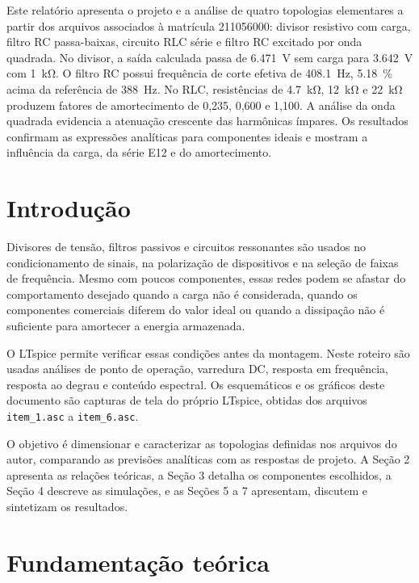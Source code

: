 \documentclass[11pt,a4paper]{article}
\begin{document}
\capa

\begin{resumo}
Este relatório apresenta o projeto e a análise de quatro topologias elementares a partir dos
arquivos associados à matrícula 211056000: divisor resistivo com carga, filtro RC passa-baixas,
circuito RLC série e filtro RC excitado por onda quadrada. No divisor, a saída calculada passa de
\SI{6,471}{\volt} sem carga para \SI{3,642}{\volt} com \SI{1}{\kilo\ohm}. O filtro RC possui
frequência de corte efetiva de \SI{408,1}{\hertz}, \SI{5,18}{\percent} acima da referência de
\SI{388}{\hertz}. No RLC, resistências de \SI{4,7}{\kilo\ohm}, \SI{12}{\kilo\ohm} e
\SI{22}{\kilo\ohm} produzem fatores de amortecimento de 0,235, 0,600 e 1,100. A análise da onda
quadrada evidencia a atenuação crescente das harmônicas ímpares. Os resultados confirmam as
expressões analíticas para componentes ideais e mostram a influência da carga, da série E12 e do
amortecimento.
\end{resumo}

\section{Introdução}

Divisores de tensão, filtros passivos e circuitos ressonantes são usados no condicionamento de
sinais, na polarização de dispositivos e na seleção de faixas de frequência. Mesmo com poucos
componentes, essas redes podem se afastar do comportamento desejado quando a carga não é
considerada, quando os componentes comerciais diferem do valor ideal ou quando a dissipação não é
suficiente para amortecer a energia armazenada.

O LTspice permite verificar essas condições antes da montagem. Neste roteiro são usadas análises de
ponto de operação, varredura DC, resposta em frequência, resposta ao degrau e conteúdo espectral.
Os esquemáticos e os gráficos deste documento são capturas de tela do próprio LTspice, obtidas
dos arquivos \texttt{item\_1.asc} a \texttt{item\_6.asc}.

O objetivo é dimensionar e caracterizar as topologias definidas nos arquivos do autor, comparando as
previsões analíticas com as respostas de projeto. A Seção 2 apresenta as relações teóricas, a Seção 3
detalha os componentes escolhidos, a Seção 4 descreve as simulações, e as Seções 5 a 7 apresentam,
discutem e sintetizam os resultados.

\section{Fundamentação teórica}
\end{document}
